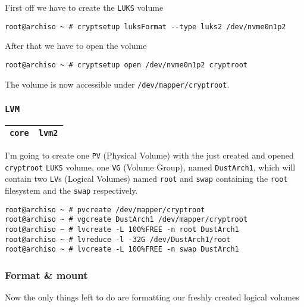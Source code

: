 \documentclass[9pt]{report}
\begin{document}
First off we have to create the \texttt{LUKS} volume


\begin{verbatim}
root@archiso ~ # cryptsetup luksFormat --type luks2 /dev/nvme0n1p2
\end{verbatim}

After that we have to open the volume


\begin{verbatim}
root@archiso ~ # cryptsetup open /dev/nvme0n1p2 cryptroot
\end{verbatim}

The volume is now accessible under \texttt{/dev/mapper/cryptroot}.



\vfill\eject

\hypertarget{x-lvm}{\subsubsection{\texttt{LVM}}}
\begin{center}
\begin{tabular}{|c|c|}
\hline
\texttt{core} & \texttt{lvm2} \\ 
\hline
\end{tabular}
\end{center}

I’m going to create one \texttt{PV} (Physical Volume) with the just created and opened \texttt{cryptroot} \texttt{LUKS} volume, one \texttt{VG} (Volume Group), named \texttt{DustArch1}, which will contain two \texttt{LV}s (Logical Volumes) named \texttt{root} and \texttt{swap} containing the \texttt{root} filesystem and the \texttt{swap} respectively.


\begin{verbatim}
root@archiso ~ # pvcreate /dev/mapper/cryptroot
root@archiso ~ # vgcreate DustArch1 /dev/mapper/cryptroot
root@archiso ~ # lvcreate -L 100%FREE -n root DustArch1
root@archiso ~ # lvreduce -l -32G /dev/DustArch1/root
root@archiso ~ # lvcreate -L 100%FREE -n swap DustArch1
\end{verbatim}


\vfill\eject

\hypertarget{x-format-and-mount}{\subsubsection{Format \& mount}}
Now the only things left to do are formatting our freshly created logical volumes
\end{document}
